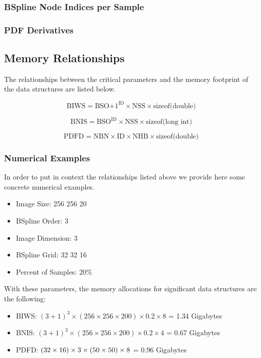 \documentclass{InsightArticle}
\begin{document}
\subsubsection{BSpline Node Indices per Sample}
\subsubsection{PDF Derivatives}

\subsection{Memory Relationships}

The relationships between the critical parameters and the memory footprint of
the data structures are listed below.

\begin{equation}
\mbox{BIWS} = \mbox{BSO+1}^{\mbox{ID}} \times \mbox{NSS} \times \mbox{sizeof(double)}
\end{equation}

\begin{equation}
\mbox{BNIS} = \mbox{BSO}^{\mbox{ID}} \times \mbox{NSS} \times \mbox{sizeof(long int)}
\end{equation}

\begin{equation}
\mbox{PDFD} = \mbox{NBN} \times \mbox{ID} \times \mbox{NHB} \times  \mbox{sizeof(double)}
\end{equation}


\subsubsection{Numerical Examples}

In order to put in context the relationships listed above we provide here some
concrete numerical examples.

\begin{itemize}
\item Image Size: 256 256 20
\item BSpline Order: 3
\item Image Dimension: 3
\item BSpline Grid: 32 32 16
\item Percent of Samples: $20\%$
\end{itemize}

With these parameters, the memory allocations for significant data structures
are the following:


\begin{itemize}
\item BIWS: $(3+1)^3 \times (256 \times 256 \times 200 ) \times 0.2 \times 8 $ = 1.34 Gigabytes 
\item BNIS: $(3+1)^3 \times (256 \times 256 \times 200 ) \times 0.2 \times 4 $ = 0.67 Gigabytes 
\item PDFD: $(32 \time 32 \times 16 ) \times 3 \times ( 50 \times 50 ) \times 8$ = 0.96 Gigabytes
\end{itemize}
\end{document}
